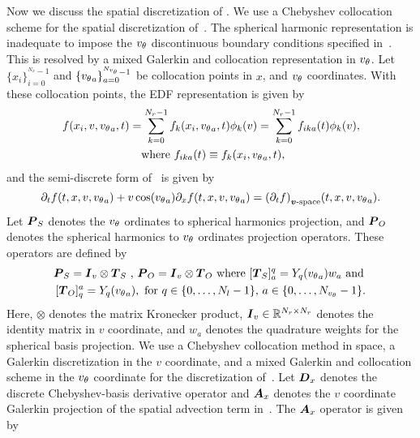 Now we discuss the spatial discretization of . We use a Chebyshev collocation scheme for the spatial discretization of~. The spherical harmonic representation is inadequate to impose the ${v_{\theta}}$ discontinuous boundary conditions specified in~. This is resolved by a mixed Galerkin and collocation representation in ${v_{\theta}}$. Let $\{x_i\}^{^{N_x}-1}_{i=0}$ and $\{{v_{\theta}}_a\}^{^{N_{v_{\theta}}}-1}_{a=0}$ be collocation points in $x$, and ${v_{\theta}}$ coordinates. With these collocation points, the EDF representation is given by
\begin{multline}
	f(x_i, v, \vtheta_a, t) = \sum_{k=0}^{N_r-1} f_{k}\of{x_i, \vtheta_a, t} \phi_{k}\of{v} = \sum_{k=0}^{N_r-1} f_{ika}\of{t} \phi_{k}\of{v}, \\ \text{ where } f_{ika}(t) \equiv f_k(x_i, \vtheta_a, t), 
\end{multline}
and the semi-discrete form of~ is given by 
\begin{equation}
\partial_t f(t, x, v, \vtheta_a) + v\cos\of{\vtheta_a} \partial_x f(t, x, v, \vtheta_a) = \of{\partial_t f}_{\text{$\vect{v}$-space}}\of{t, x, v, \vtheta_a} \label{eq:bte_1d_semi_discrete}.
\end{equation} Let $\boldsymbol{P}_{S}$ denotes the ${v_{\theta}}$ ordinates to spherical harmonics projection, and $\boldsymbol{P}_{O}$ denotes the spherical harmonics to ${v_{\theta}}$ ordinates projection operators. These operators are defined by
\begin{multline}
	\vect P_S = \vect I_v \otimes \vect T_S \text{ , } \vect P_O = \vect I_v \otimes \vect T_O \text{ where } 
	[\vect T_{S}]^{q}_{a} = Y_{q}\of{\vtheta_a} w_a \text{ and }\\
	[\vect T_{O}]^{a}_{q} = Y_{q}\of{\vtheta_a}, 
	\text{ for } q \in \{0, \hdots, N_l-1\}\text{, } a\in \{0, \hdots, N_\vtheta-1\}\label{eq:proj_ops} .
\end{multline} Here, $\otimes$ denotes the matrix Kronecker product, $\boldsymbol{I}_v\in \mathbb{R}^{N_r\times N_r}$ denotes the identity matrix in $v$ coordinate, and $w_a$ denotes the quadrature weights for the spherical basis projection. We use a Chebyshev collocation method in space, a Galerkin discretization in the $v$ coordinate, and a mixed Galerkin and collocation scheme in the ${v_{\theta}}$ coordinate for the discretization of~. Let $\boldsymbol{D}_x$ denotes the discrete Chebyshev-basis derivative operator and $\boldsymbol{A}_x$ denotes the $v$ coordinate Galerkin projection of the spatial advection term in~. The $\boldsymbol{A}_x$ operator is given by
